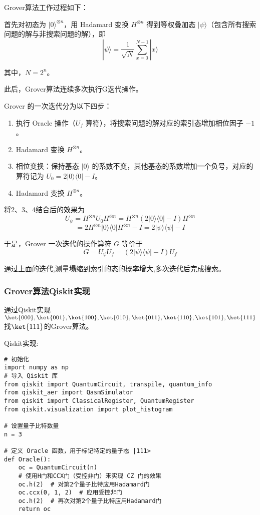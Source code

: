 Grover算法工作过程如下：

首先对初态为 $|0\rangle^{\otimes n}$，用 Hadamard 变换 $H^{\otimes n}$ 得到等权叠加态 $|\psi\rangle$（包含所有搜索问题的解与非搜索问题的解），即
\[
|\psi\rangle = \frac{1}{\sqrt{N}} \sum_{x=0}^{N-1} |x\rangle
\]

其中，$N = 2^n$。

此后，Grover算法连续多次执行G迭代操作。

Grover 的一次迭代分为以下四步：
\begin{enumerate}
    \item 执行 Oracle 操作（$U_f$ 算符），将搜索问题的解对应的索引态增加相位因子 $-1$。
    \item Hadamard 变换 $H^{\otimes n}$。
    \item 相位变换：保持基态 $|0\rangle$ 的系数不变，其他基态的系数增加一个负号，对应的算符记为 $U_0 = 2|0\rangle\langle 0| - I$。
    \item Hadamard 变换 $H^{\otimes n}$。
\end{enumerate}

将2、3、4结合后的效果为
\[
U_{\psi} = H^{\otimes n} U_0 H^{\otimes n} = H^{\otimes n} (2|0\rangle\langle 0| - I) H^{\otimes n}
\]
\[
= 2H^{\otimes n} |0\rangle\langle 0| H^{\otimes n} - I = 2|\psi\rangle\langle\psi| - I
\]

于是，Grover 一次迭代的操作算符 $G$ 等价于
\[
G = U_{\psi} U_f = (2|\psi\rangle\langle\psi| - I) U_f
\]

通过上面的迭代,测量塌缩到索引的态的概率增大,多次迭代后完成搜索。
\subsubsection{Grover算法Qiskit实现}
通过Qiskit实现$\ket{000},\ket{001},\ket{100},\ket{010},\ket{011},\ket{110},\ket{101},\ket{111}$找$\ket{111}$的Grover算法。

Qiskit实现:


\begin{py}
\begin{lstlisting}
# 初始化
import numpy as np
# 导入 Qiskit 库
from qiskit import QuantumCircuit, transpile, quantum_info
from qiskit_aer import QasmSimulator
from qiskit import ClassicalRegister, QuantumRegister
from qiskit.visualization import plot_histogram

# 设置量子比特数量
n = 3

# 定义 Oracle 函数，用于标记特定的量子态 |111>
def Oracle():  
    oc = QuantumCircuit(n) 
    # 使用H门和CCX门（受控非门）来实现 CZ 门的效果
    oc.h(2)  # 对第2个量子比特应用Hadamard门
    oc.ccx(0, 1, 2)  # 应用受控非门
    oc.h(2)  # 再次对第2个量子比特应用Hadamard门
    return oc

\end{lstlisting}
\end{py}

